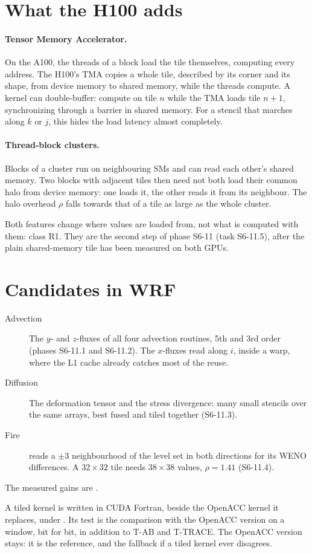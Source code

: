 \section{What the H100 adds}

\paragraph{Tensor Memory Accelerator.} On the A100, the threads of a block load the tile themselves, computing every
address. The H100's TMA copies a whole tile, described by its corner and its shape, from device memory to shared
memory, while the threads compute. A kernel can double-buffer: compute on tile $n$ while the TMA loads tile $n+1$,
synchronizing through a barrier in shared memory. For a stencil that marches along $k$ or $j$, this hides the load
latency almost completely.

\paragraph{Thread-block clusters.} Blocks of a cluster run on neighbouring SMs and can read each other's shared memory.
Two blocks with adjacent tiles then need not both load their common halo from device memory: one loads it, the other
reads it from its neighbour. The halo overhead $\rho$ falls towards that of a tile as large as the whole cluster.

Both features change where values are loaded from, not what is computed with them: class R1. They are the second step
of phase S6-11 (task S6-11.5), after the plain shared-memory tile has been measured on both GPUs.

\section{Candidates in WRF}

\begin{description}
  \item[Advection] The $y$- and $z$-fluxes of all four advection routines, 5th and 3rd order (phases S6-11.1 and
    S6-11.2). The $x$-fluxes read along $i$, inside a warp, where the L1 cache already catches most of the reuse.
  \item[Diffusion] The deformation tensor and the stress divergence: many small stencils over the same arrays, best
    fused and tiled together (S6-11.3).
  \item[Fire]  reads a $\pm3$ neighbourhood of the level set in both directions for its WENO
    differences. A $32 \times 32$ tile needs $38 \times 38$ values, $\rho = 1.41$ (S6-11.4).
\end{description}
The measured gains are \tbr.

\begin{portnote}
A tiled kernel is written in CUDA Fortran, beside the OpenACC kernel it replaces, under . Its
test is the comparison with the OpenACC version on a window, bit for bit, in addition to T-AB and T-TRACE. The
OpenACC version stays: it is the reference, and the fallback if a tiled kernel ever disagrees.
\end{portnote}

